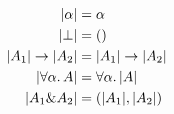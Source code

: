 
\begin{align*}
  \lvert \alpha \rvert              &= \alpha \\
  \lvert \bot \rvert                &= () \\
  \lvert A_1 \rvert \to \lvert A_2 \rvert &= \lvert A_1 \rvert \to \lvert A_2 \rvert \\
  \lvert \forall \alpha.\, A \rvert     &= \forall \alpha.\, \lvert A \rvert \\
  \lvert A_1 \& A_2 \rvert    &= (\lvert A_1 \rvert, \lvert A_2 \rvert) \\
\end{align*}
